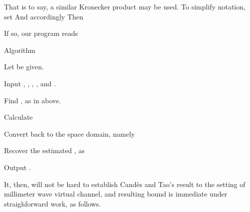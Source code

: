 That is to say, a similar Kronecker product may be used.
To simplify notation, set
And accordingly
Then

\stopsection
\startsection [title={Proposed Method}]

If so, our program reads

\Result
{Algorithm}
{
\startitemize[n]
\item Let  be given.
\item Input ,
,
,
,
and .
\item Find ,  as in above.
\item Calculate
\item Convert  back to the space domain, namely
\item Recover the estimated , as
\item Output .
\stopitemize
}

It, then, will not be hard to establish Cand\`es and Tao's result to the setting of millimeter wave virtual channel, and resulting bound is immediate under straighforward work, as follows.

\stopsection
\stopchapter
